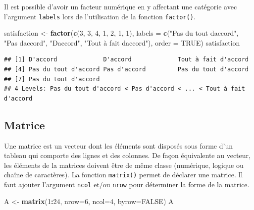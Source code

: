 \documentclass[
]{book}
\newenvironment{Shaded}{\begin{snugshade}}{\end{snugshade}}
\newcommand{\AttributeTok}[1]{\textcolor[rgb]{0.13,0.29,0.53}{#1}}
\newcommand{\ConstantTok}[1]{\textcolor[rgb]{0.56,0.35,0.01}{#1}}
\newcommand{\DecValTok}[1]{\textcolor[rgb]{0.00,0.00,0.81}{#1}}
\newcommand{\FunctionTok}[1]{\textcolor[rgb]{0.13,0.29,0.53}{\textbf{#1}}}
\newcommand{\NormalTok}[1]{#1}
\newcommand{\OtherTok}[1]{\textcolor[rgb]{0.56,0.35,0.01}{#1}}
\newcommand{\SpecialCharTok}[1]{\textcolor[rgb]{0.81,0.36,0.00}{\textbf{#1}}}
\newcommand{\StringTok}[1]{\textcolor[rgb]{0.31,0.60,0.02}{#1}}
\begin{document}
Il est possible d'avoir un facteur numérique en y affectant une catégorie avec l'argument \texttt{labels} lors de l'utilisation de la fonction \texttt{factor()}.

\begin{Shaded}
\begin{Highlighting}[]
\NormalTok{satisfaction }\OtherTok{\textless{}{-}} \FunctionTok{factor}\NormalTok{(}\FunctionTok{c}\NormalTok{(}\DecValTok{3}\NormalTok{, }\DecValTok{3}\NormalTok{, }\DecValTok{4}\NormalTok{, }\DecValTok{1}\NormalTok{, }\DecValTok{2}\NormalTok{, }\DecValTok{1}\NormalTok{, }\DecValTok{1}\NormalTok{), }\AttributeTok{labels =} \FunctionTok{c}\NormalTok{(}\StringTok{"Pas du tout d\textquotesingle{}accord"}\NormalTok{, }\StringTok{"Pas d\textquotesingle{}accord"}\NormalTok{, }\StringTok{"D\textquotesingle{}accord"}\NormalTok{, }\StringTok{"Tout à fait d\textquotesingle{}accord"}\NormalTok{), }\AttributeTok{order =} \ConstantTok{TRUE}\NormalTok{)}
\NormalTok{satisfaction}
\end{Highlighting}
\end{Shaded}

\begin{verbatim}
## [1] D'accord             D'accord             Tout à fait d'accord
## [4] Pas du tout d'accord Pas d'accord         Pas du tout d'accord
## [7] Pas du tout d'accord
## 4 Levels: Pas du tout d'accord < Pas d'accord < ... < Tout à fait d'accord
\end{verbatim}

\subsection{Matrice}\label{matrice}

Une matrice est un vecteur dont les éléments sont disposés sous forme d'un tableau qui comporte des lignes et des colonnes. De façon équivalente au vecteur, les éléments de la matrices doivent être de même classe (numérique, logique ou chaîne de caractères). La fonction \texttt{matrix()} permet de déclarer une matrice. Il faut ajouter l'argument \texttt{ncol} et/ou \texttt{nrow} pour déterminer la forme de la matrice.

\begin{Shaded}
\begin{Highlighting}[]
\NormalTok{A }\OtherTok{\textless{}{-}} \FunctionTok{matrix}\NormalTok{(}\DecValTok{1}\SpecialCharTok{:}\DecValTok{24}\NormalTok{, }\AttributeTok{nrow=}\DecValTok{6}\NormalTok{, }\AttributeTok{ncol=}\DecValTok{4}\NormalTok{, }\AttributeTok{byrow=}\ConstantTok{FALSE}\NormalTok{)}
\NormalTok{A}
\end{Highlighting}
\end{Shaded}
\end{document}
